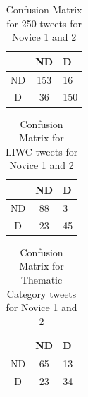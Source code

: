 \documentclass[11pt]{article}
\begin{document}
\begin{table}[h]
\centering
\begin{tabular}{c|c|l|}
\cline{2-3}
                         & ND  & D   \\ \hline
\multicolumn{1}{|c|}{ND} & 153 & 16  \\ \hline
\multicolumn{1}{|c|}{D}  & 36  & 150 \\ \hline
\end{tabular}
\caption {Confusion Matrix for 250 tweets for Novice 1 and 2}
\end{table}


\begin{table}[h]
\centering
\begin{tabular}{c|c|l|}
\cline{2-3}
                         & ND & D  \\ \hline
\multicolumn{1}{|c|}{ND} & 88 & 3  \\ \hline
\multicolumn{1}{|c|}{D}  & 23 & 45 \\ \hline
\end{tabular}
\caption {Confusion Matrix for LIWC tweets for Novice 1 and 2}
\end{table}

\begin{table}[h]
\centering
\begin{tabular}{c|c|l|}
\cline{2-3}
                         & ND & D  \\ \hline
\multicolumn{1}{|c|}{ND} & 65 & 13 \\ \hline
\multicolumn{1}{|c|}{D}  & 23 & 34 \\ \hline
\end{tabular}
\caption {Confusion Matrix for Thematic Category tweets for Novice 1 and 2}
\end{table}
\end{document}
